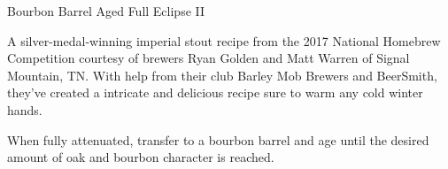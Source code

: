 \stylesection{\styleimperialstout}

\begin{recipie}{Bourbon Barrel Aged Full Eclipse II}

\begin{aboutblock}
A silver-medal-winning imperial stout recipe from the 2017 National Homebrew
Competition courtesy of brewers Ryan Golden and Matt Warren of Signal Mountain, TN.
With help from their club Barley Mob Brewers and BeerSmith, they've created a
intricate and delicious recipe sure to warm any cold winter hands. \sourceaha
\end{aboutblock}


\begin{methodandtiming}
 
\begin{mashsteps}
\end{mashsteps}

\begin{fermentationsteps}
\end{fermentationsteps}

\begin{directions}
When fully attenuated, transfer to a bourbon barrel and age until the desired amount
of oak and bourbon character is reached.
\end{directions}

\end{methodandtiming}

\pagebreak

\begin{ingredientsblock}

\begin{malts}
\end{malts}

\begin{hops}

\end{hops}


\end{ingredientsblock}

\end{recipie}

